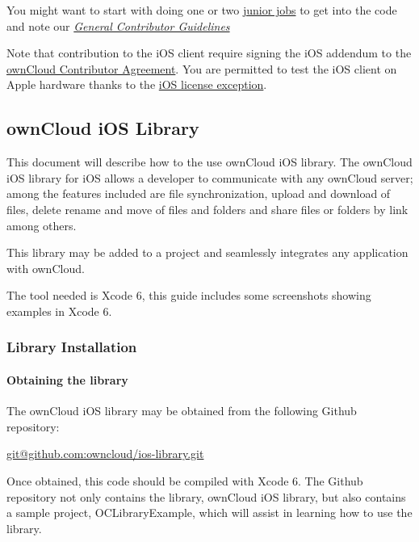 \documentclass[letterpaper,10pt,english]{sphinxmanual}
\begin{document}
You might want to start with doing one or two \href{https://github.com/owncloud/ios/issues?q=is\%3Aopen+is\%3Aissue+label\%3A\%22Junior+Job\%22}{junior jobs}
to get into the code and note our {\hyperref[general/index::doc]{\emph{\emph{General Contributor Guidelines}}}}

Note that contribution to the iOS client require signing the iOS addendum to the
\href{https://owncloud.org/contribute/agreement/}{ownCloud Contributor Agreement}. You are
permitted to test the iOS client on Apple hardware thanks to the
\href{https://owncloud.org/contribute/iOS-license-exception/}{iOS license exception}.


\subsection{ownCloud iOS Library}
\label{ios_library/index:owncloud-ios-library}
This document will describe how to the use ownCloud iOS library.  The ownCloud
iOS library for iOS allows a developer to communicate with any ownCloud server;
among the features included are file synchronization, upload and download of
files, delete rename and move of files and folders and share files or folders
by link among others.

This library may be added to a project and seamlessly integrates any
application with ownCloud.

The tool needed is Xcode 6, this guide includes some screenshots showing
examples in Xcode 6.
\label{ios_library/index:iosindex}

\subsubsection{Library Installation}
\label{ios_library/library_installation:library-installation}\label{ios_library/library_installation::doc}

\paragraph{Obtaining the library}
\label{ios_library/library_installation:obtaining-the-library}
The ownCloud iOS library may be obtained from the following Github repository:

\href{mailto:git@github.com:owncloud/ios-library.git}{git@github.com:owncloud/ios-library.git}

Once obtained, this code should be compiled with Xcode 6.  The Github
repository not only contains the library, ownCloud iOS library, but also
contains a sample project, OCLibraryExample, which will assist in learning how
to use the library.
\end{document}

